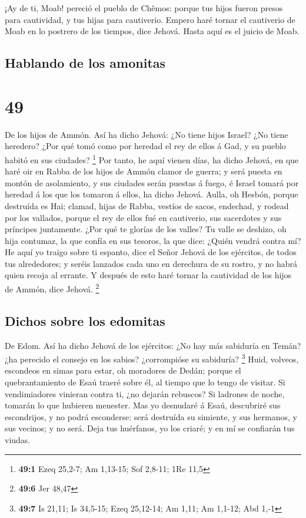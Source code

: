  ¡Ay de ti, Moab! pereció el pueblo de Chêmos: porque tus
hijos fueron presos para cautividad, y tus hijas para cautiverio.
 Empero haré tornar el cautiverio de Moab en lo postrero de
los tiempos, dice Jehová. Hasta aquí es el juicio de Moab.

\hypertarget{hablando-de-los-amonitas}{%
\subsection{Hablando de los amonitas}\label{hablando-de-los-amonitas}}

\hypertarget{section-48}{%
\section{49}\label{section-48}}

 De los hijos de Ammón. Así ha dicho Jehová: ¿No tiene hijos
Israel? ¿No tiene heredero? ¿Por qué tomó como por heredad el rey de
ellos á Gad, y su pueblo habitó en sus ciudades? \footnote{\textbf{49:1}
  Ezeq 25,2-7; Am 1,13-15; Sof 2,8-11; 1Re 11,5}  Por tanto,
he aquí vienen días, ha dicho Jehová, en que haré oir en Rabba de los
hijos de Ammón clamor de guerra; y será puesta en montón de asolamiento,
y sus ciudades serán puestas á fuego, é Israel tomará por heredad á los
que los tomaron á ellos, ha dicho Jehová.  Aulla, oh Hesbón,
porque destruída es Hai; clamad, hijas de Rabba, vestíos de sacos,
endechad, y rodead por los vallados, porque el rey de ellos fué en
cautiverio, sus sacerdotes y sus príncipes juntamente.  ¿Por
qué te glorías de los valles? Tu valle se deshizo, oh hija contumaz, la
que confía en sus tesoros, la que dice: ¿Quién vendrá contra mí?
 He aquí yo traigo sobre ti espanto, dice el Señor Jehová de
los ejércitos, de todos tus alrededores; y seréis lanzados cada uno en
derechura de su rostro, y no habrá quien recoja al errante. 
Y después de esto haré tornar la cautividad de los hijos de Ammón, dice
Jehová. \footnote{\textbf{49:6} Jer 48,47}

\hypertarget{dichos-sobre-los-edomitas}{%
\subsection{Dichos sobre los edomitas}\label{dichos-sobre-los-edomitas}}

 De Edom. Así ha dicho Jehová de los ejércitos: ¿No hay más
sabiduría en Temán? ¿ha perecido el consejo en los sabios? ¿corrompióse
su sabiduría? \footnote{\textbf{49:7} Is 21,11; Is 34,5-15; Ezeq
  25,12-14; Am 1,11; Am 1,1-12; Abd 1,-1}  Huid, volveos,
escondeos en simas para estar, oh moradores de Dedán; porque el
quebrantamiento de Esaú traeré sobre él, al tiempo que lo tengo de
visitar.  Si vendimiadores vinieran contra ti, ¿no dejarán
rebuscos? Si ladrones de noche, tomarán lo que hubieren menester.
 Mas yo desnudaré á Esaú, descubriré sus escondrijos, y no
podrá esconderse: será destruída su simiente, y sus hermanos, y sus
vecinos; y no será.  Deja tus huérfanos, yo los criaré; y
en mí se confiarán tus viudas.

